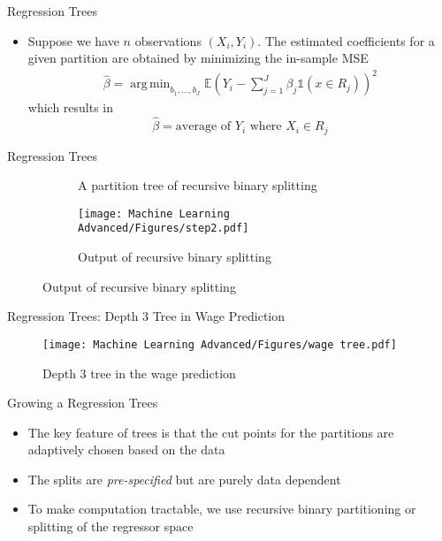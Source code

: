 \documentclass[aspectratio=1610,12pt,xcolor=dvipsnames]{beamer}
\DeclareMathOperator*{\argmin}{arg\,min}
\begin{document}
\begin{frame}{Regression Trees}

\begin{itemize}
    \item Suppose we have $n$ observations $(X_i,Y_i)$. The estimated coefficients for a given partition are obtained by minimizing the in-sample MSE
    \begin{align*}
        \hat \beta = \argmin_{b_1,...,b_J} \mathbb{E}\left( Y_i - \sum_{j=1}^J \beta_j \mathds{1} (x \in R_j) \right)^2
    \end{align*}
    which results in 
    \[
    \hat \beta = \text{average of } Y_i \text{ where } X_i \in R_j
    \]
\end{itemize}
\end{frame}

\begin{frame}{Regression Trees}

\begin{figure}
    \centering
  \begin{subfigure}{0.45\linewidth}
    \centering
    \caption*{A partition tree of recursive binary splitting}
  \end{subfigure}%
  \hspace{10pt}
  \begin{subfigure}{0.45\linewidth}
    \centering
    \texttt{[image: Machine Learning Advanced/Figures/step2.pdf]}
    \caption*{Output of recursive binary splitting}
  \end{subfigure}
\end{figure}
\end{frame}

\begin{frame}{Regression Trees: Depth 3 Tree in Wage Prediction}

\begin{figure}
    \centering
    \texttt{[image: Machine Learning Advanced/Figures/wage tree.pdf]}
    \caption{Depth 3 tree in the wage prediction}
\end{figure}
\end{frame}

\begin{frame}{Growing a Regression Trees}

\begin{itemize}
    \item The key feature of trees is that the cut points for the partitions are adaptively chosen based on the data
    \item The splits are \textit{pre-specified} but are purely data dependent
    \item To make computation tractable, we use recursive binary partitioning or splitting of the regressor space
\end{itemize}
\end{frame}
\end{document}
